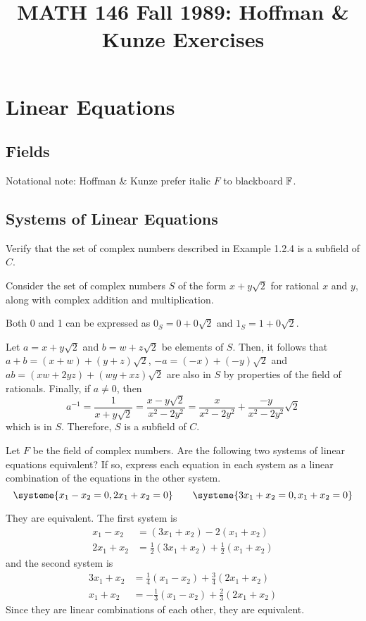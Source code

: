 \documentclass[notes]{agony}
\title{MATH 146 Fall 1989: Hoffman \& Kunze Exercises}
\begin{document}
\thispagestyle{firstpage}
\renewcommand{\contentsname}{MATH 146 Fall 1989:\\{\Large Exercises from Hoffman \& Kunze, \emph{Linear Algebra}, 2nd ed.}}
\tableofcontents

\chapter{Linear Equations}
\section{Fields}\label{sec:fields}
Notational note: Hoffman \& Kunze prefer italic $F$ to blackboard $\mathbb{F}$.

\section{Systems of Linear Equations}

\begin{xca}
  Verify that the set of complex numbers described in Example 1.2.4 is a subfield of $C$.
\end{xca}
\begin{prf}
  Consider the set of complex numbers $S$ of the form $x + y\sqrt2$ for rational $x$ and $y$,
  along with complex addition and multiplication.

  Both 0 and 1 can be expressed as $0_S = 0+0\sqrt2$ and $1_S = 1 + 0\sqrt2$.

  Let $a = x + y\sqrt2$ and $b = w + z\sqrt2$ be elements of $S$.
  Then, it follows that $a+b = (x+w) + (y+z)\sqrt2$, $-a = (-x) + (-y)\sqrt2$
  and $ab = (xw + 2yz) + (wy + xz)\sqrt2$ are also in $S$ by properties of the field of rationals.
  Finally, if $a \neq 0$, then
  \[ a^{-1} = \frac{1}{x+y\sqrt2} = \frac{x-y\sqrt2}{x^2-2y^2} = \frac{x}{x^2-2y^2} + \frac{-y}{x^2-2y^2}\sqrt2 \]
  which is in $S$.
  Therefore, $S$ is a subfield of $C$.
\end{prf}

\begin{xca}\label{xca:sysequiv}
  Let $F$ be the field of complex numbers.
  Are the following two systems of linear equations equivalent?
  If so, express each equation in each system as a linear combination of the equations in the other system.
  \[ \systeme{x_1-x_2=0, 2x_1+x_2=0} \qquad \systeme{3x_1+x_2=0, x_1+x_2=0} \]
\end{xca}
\begin{prf}
  They are equivalent. The first system is
  \begin{align*}
    x_1 - x_2  & = (3x_1 + x_2) - 2(x_1 + x_2)                \\
    2x_1 + x_2 & = \tfrac12(3x_1 + x_2) + \tfrac12(x_1 + x_2)
  \end{align*}
  and the second system is
  \begin{align*}
    3x_1 + x_2 & = \tfrac14(x_1 - x_2) + \tfrac34(2x_1 + x_2)  \\
    x_1 + x_2  & = -\tfrac13(x_1 - x_2) + \tfrac23(2x_1 + x_2)
  \end{align*}
  Since they are linear combinations of each other, they are equivalent.
\end{prf}
\end{document}
